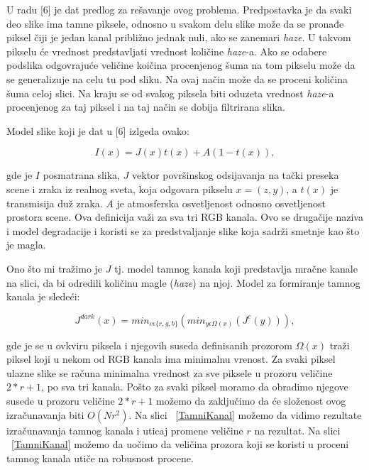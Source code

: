 \documentclass[a4paper,12pt,titlepage]{article}
\begin{document}
U radu [6] je dat predlog za rešavanje ovog problema. Predpostavka je da svaki deo slike ima tamne piksele, odnosno u svakom delu slike može da se pronađe piksel čiji je jedan kanal približno jednak nuli, ako se zanemari \emph{haze}. U takvom pikselu će vrednost predstavljati vrednost količine \emph{haze}-a. Ako se odabere podslika odgovrajuće veličine koičina procenjenog šuma na tom pikselu može da se generalizuje na celu tu pod sliku. Na ovaj način može da se proceni količina šuma celoj slici. Na kraju se od svakog piksela biti oduzeta vrednost \emph{haze}-a procenjenog za taj piksel i na taj način se dobija filtrirana slika.

Model slike koji je dat u [6] izlgeda ovako:

\begin{equation}\label{eq:haze1}
I(x) = J(x)t(x) + A(1 - t(x)),
\end{equation}

gde je $I$ posmatrana slika, $J$ vektor površinskog odsijavanja na tački preseka scene i zraka iz realnog sveta, koja odgovara pikselu $x = (z, y)$, a $t(x)$ je transmisija duž zraka. $A$ je atmosferska osvetljenost odnosno osvetljenost prostora scene. Ova definicija važi za sva tri RGB kanala. Ovo se drugačije naziva i model degradacije i koristi se za predstvaljanje slike koja sadrži smetnje kao što je magla.   

Ono što mi tražimo je $J$ tj. model tamnog kanala koji predstavlja mračne kanale na slici, da bi odredili količinu magle (\emph{haze}) na njoj. Model za formiranje tamnog kanala je sledeći:

\begin{equation}\label{eq:haze2}
J^{dark}(x) = min_{c \epsilon \{r, g, b \}}( min_{y \epsilon \Omega (x)} (J^c (y)) ),
\end{equation}

gde je se u ovkviru piksela i njegovih suseda definisanih prozorom $\Omega(x)$ traži piksel koji u nekom od RGB kanala ima minimalnu vrenost. Za svaki piksel ulazne slike se računa minimalna vrednost za sve piksele u prozoru veličine $2*r + 1$, po sva tri kanala. Pošto za svaki piksel moramo da obradimo njegove susede u prozoru veličine $2*r + 1$ možemo da zaključimo da će složenost ovog izračunavanja biti $O(Nr^2)$. Na slici ~\ref{TamniKanal} možemo da vidimo rezultate izračunavanja tamnog kanala i uticaj promene veličine $r$ na rezultat. Na slici ~\ref{TamniKanal} možemo da uočimo da veličina prozora koji se koristi u proceni tamnog kanala utiče na robusnost procene. 
\end{document}
